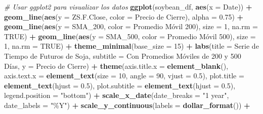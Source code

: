 \documentclass[
]{book}
\newenvironment{Shaded}{\begin{snugshade}}{\end{snugshade}}
\newcommand{\AttributeTok}[1]{\textcolor[rgb]{0.13,0.29,0.53}{#1}}
\newcommand{\CommentTok}[1]{\textcolor[rgb]{0.56,0.35,0.01}{\textit{#1}}}
\newcommand{\ConstantTok}[1]{\textcolor[rgb]{0.56,0.35,0.01}{#1}}
\newcommand{\DecValTok}[1]{\textcolor[rgb]{0.00,0.00,0.81}{#1}}
\newcommand{\FloatTok}[1]{\textcolor[rgb]{0.00,0.00,0.81}{#1}}
\newcommand{\FunctionTok}[1]{\textcolor[rgb]{0.13,0.29,0.53}{\textbf{#1}}}
\newcommand{\NormalTok}[1]{#1}
\newcommand{\SpecialCharTok}[1]{\textcolor[rgb]{0.81,0.36,0.00}{\textbf{#1}}}
\newcommand{\StringTok}[1]{\textcolor[rgb]{0.31,0.60,0.02}{#1}}
\begin{document}
\begin{Shaded}
\begin{Highlighting}[]
\CommentTok{\# Usar ggplot2 para visualizar los datos}
\FunctionTok{ggplot}\NormalTok{(soybean\_df, }\FunctionTok{aes}\NormalTok{(}\AttributeTok{x =}\NormalTok{ Date)) }\SpecialCharTok{+}
  \FunctionTok{geom\_line}\NormalTok{(}\FunctionTok{aes}\NormalTok{(}\AttributeTok{y =}\NormalTok{ ZS.F.Close, }\AttributeTok{color =} \StringTok{\textquotesingle{}Precio de Cierre\textquotesingle{}}\NormalTok{),}
  \AttributeTok{alpha =} \FloatTok{0.75}\NormalTok{) }\SpecialCharTok{+}
  \FunctionTok{geom\_line}\NormalTok{(}\FunctionTok{aes}\NormalTok{(}\AttributeTok{y =}\NormalTok{ SMA\_200, }\AttributeTok{color =} \StringTok{\textquotesingle{}Promedio Móvil 200\textquotesingle{}}\NormalTok{), }
  \AttributeTok{size =} \DecValTok{1}\NormalTok{, }\AttributeTok{na.rm =} \ConstantTok{TRUE}\NormalTok{) }\SpecialCharTok{+}
  \FunctionTok{geom\_line}\NormalTok{(}\FunctionTok{aes}\NormalTok{(}\AttributeTok{y =}\NormalTok{ SMA\_500, }\AttributeTok{color =} \StringTok{\textquotesingle{}Promedio Móvil 500\textquotesingle{}}\NormalTok{), }
  \AttributeTok{size =} \DecValTok{1}\NormalTok{, }\AttributeTok{na.rm =} \ConstantTok{TRUE}\NormalTok{) }\SpecialCharTok{+}
  \FunctionTok{theme\_minimal}\NormalTok{(}\AttributeTok{base\_size =} \DecValTok{15}\NormalTok{) }\SpecialCharTok{+}
  \FunctionTok{labs}\NormalTok{(}\AttributeTok{title =} \StringTok{\textquotesingle{}Serie de Tiempo de Futuros de Soja\textquotesingle{}}\NormalTok{,}
       \AttributeTok{subtitle =} \StringTok{\textquotesingle{}Con Promedios Móviles de 200 y 500 Días\textquotesingle{}}\NormalTok{,}
       \AttributeTok{y =} \StringTok{\textquotesingle{}Precio de Cierre\textquotesingle{}}\NormalTok{) }\SpecialCharTok{+}
  \FunctionTok{theme}\NormalTok{(}\AttributeTok{axis.title.x =} \FunctionTok{element\_blank}\NormalTok{(),}
        \AttributeTok{axis.text.x =} \FunctionTok{element\_text}\NormalTok{(}\AttributeTok{size =} \DecValTok{10}\NormalTok{, }\AttributeTok{angle =} \DecValTok{90}\NormalTok{, }
        \AttributeTok{vjust =} \FloatTok{0.5}\NormalTok{),}
        \AttributeTok{plot.title =} \FunctionTok{element\_text}\NormalTok{(}\AttributeTok{hjust =} \FloatTok{0.5}\NormalTok{),}
        \AttributeTok{plot.subtitle =} \FunctionTok{element\_text}\NormalTok{(}\AttributeTok{hjust =} \FloatTok{0.5}\NormalTok{),}
        \AttributeTok{legend.position =} \StringTok{"bottom"}\NormalTok{) }\SpecialCharTok{+}
  \FunctionTok{scale\_x\_date}\NormalTok{(}\AttributeTok{date\_breaks =} \StringTok{"1 year"}\NormalTok{, }\AttributeTok{date\_labels =} \StringTok{"\%Y"}\NormalTok{) }\SpecialCharTok{+}
  \FunctionTok{scale\_y\_continuous}\NormalTok{(}\AttributeTok{labels =} \FunctionTok{dollar\_format}\NormalTok{()) }\SpecialCharTok{+}

\end{Highlighting}
\end{Shaded}
\end{document}

